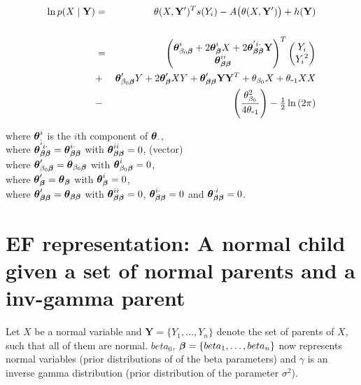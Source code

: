 \documentclass[11pt, oneside]{article}   	%
\numberwithin{figure}{section}
\numberwithin{equation}{section}
\numberwithin{table}{section}
\theoremstyle{definition}
\begin{document}
\begin{appendices}
\begin{itemize}
\begin{eqnarray*}
\ln p(X\mid \mathbf{Y}) &=& \theta(X,\mathbf Y')^T s(Y_i) - A \big(\theta(X,\mathbf Y') \big) + h(\mathbf{Y})\\\\
&=&
\begin{pmatrix}
\boldsymbol \theta_{\beta_0\boldsymbol \beta}^i + 2\boldsymbol \theta_{\boldsymbol \beta}^iX + 2\boldsymbol \theta_{\boldsymbol \beta\boldsymbol \beta}^{'i \cdot}\mathbf Y \\
\boldsymbol \theta_{\boldsymbol \beta\boldsymbol \beta}^{ii} 
\end{pmatrix}^T
\begin{pmatrix}
Y_i\\
{Y_i}^2\\
\end{pmatrix}\\
&+& \boldsymbol \theta_{\beta_0\boldsymbol \beta}'Y + 2\boldsymbol \theta_{\boldsymbol \beta}'XY  + \boldsymbol \theta_{\boldsymbol \beta\boldsymbol \beta}'\mathbf Y\mathbf Y^T + \theta_{\beta_0}X + \theta_{\mbox{-}1}XX \\
&-& \left( \frac{\theta_{\beta_0}^2}{4\theta_{\mbox{-}1}} \right) - \tfrac{1}{2}\ln{(2\pi)}
\end{eqnarray*}

where $\boldsymbol \theta_{\cdot}^i$ is the $i$th component of $\boldsymbol \theta_{\cdot}$,\\
where $\boldsymbol \theta_{\boldsymbol \beta\boldsymbol \beta}^{'i\cdot} = \boldsymbol \theta_{\boldsymbol \beta\boldsymbol \beta}^{i\cdot}$ with $\boldsymbol \theta_{\boldsymbol \beta\boldsymbol \beta}^{ii} = 0$, (vector)\\
where $\boldsymbol \theta_{\beta_0\boldsymbol \beta}' = \boldsymbol \theta_{\beta_0\boldsymbol \beta}$ with $\boldsymbol \theta_{\beta_0\boldsymbol \beta}^i = 0$,\\
where $\boldsymbol \theta_{\boldsymbol \beta}' = \boldsymbol \theta_{\boldsymbol \beta}$ with $\boldsymbol \theta_{\boldsymbol \beta}^i = 0$,\\
where $\boldsymbol \theta_{\boldsymbol \beta\boldsymbol \beta}' = \boldsymbol \theta_{\boldsymbol \beta\boldsymbol \beta}$ with $\boldsymbol \theta_{\boldsymbol \beta\boldsymbol \beta}^{ii} = 0$, $\boldsymbol \theta_{\boldsymbol \beta\boldsymbol \beta}^{i\cdot} = 0$  and $\boldsymbol \theta_{\boldsymbol \beta\boldsymbol \beta}^{\cdot i} = 0$.\\


\end{itemize}

\newpage
\section{EF representation: A normal child given a set of normal parents and a inv-gamma parent}

Let $X$ be a normal variable and $ \mathbf{Y} = \{Y_1,\ldots,Y_n\}$ denote the set of parents of $X$, such that all of them are normal. $beta_0$, $ \boldsymbol \beta = \{beta_1,\ldots,beta_n\}$ now represents normal variables (prior distributions of of the beta parameters) and $\gamma$ is an inverse gamma distribution (prior distribution of the parameter $\sigma^2$).


\end{appendices}
\end{document}
